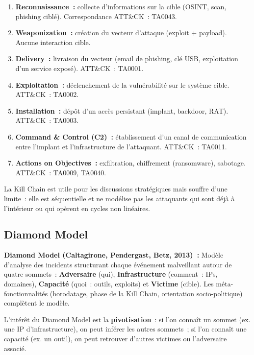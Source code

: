 \begin{enumerate}
  \item \textbf{Reconnaissance~:} collecte d'informations sur la cible (OSINT,
        scan, phishing ciblé). Correspondance ATT\&CK~: TA0043.
  \item \textbf{Weaponization~:} création du vecteur d'attaque (exploit +
        payload). Aucune interaction cible.
  \item \textbf{Delivery~:} livraison du vecteur (email de phishing, clé USB,
        exploitation d'un service exposé). ATT\&CK~: TA0001.
  \item \textbf{Exploitation~:} déclenchement de la vulnérabilité sur le
        système cible. ATT\&CK~: TA0002.
  \item \textbf{Installation~:} dépôt d'un accès persistant (implant,
        backdoor, RAT). ATT\&CK~: TA0003.
  \item \textbf{Command \& Control (C2)~:} établissement d'un canal de
        communication entre l'implant et l'infrastructure de l'attaquant.
        ATT\&CK~: TA0011.
  \item \textbf{Actions on Objectives~:} exfiltration, chiffrement
        (ransomware), sabotage. ATT\&CK~: TA0009, TA0040.
\end{enumerate}

La Kill Chain est utile pour les discussions stratégiques mais souffre
d'une limite~: elle est séquentielle et ne modélise pas les attaquants
qui sont déjà à l'intérieur ou qui opèrent en cycles non linéaires.

\subsection{Diamond Model}

\begin{boxdef}
\textbf{Diamond Model (Caltagirone, Pendergast, Betz, 2013)~:}
Modèle d'analyse des incidents structurant chaque événement malveillant
autour de quatre sommets~: \textbf{Adversaire} (qui), \textbf{Infrastructure}
(comment~: IPs, domaines), \textbf{Capacité} (quoi~: outils, exploits)
et \textbf{Victime} (cible). Les méta-fonctionnalités (horodatage,
phase de la Kill Chain, orientation socio-politique) complètent le modèle.
\end{boxdef}

L'intérêt du Diamond Model est la \textbf{pivotisation}~: si l'on
connaît un sommet (ex. une IP d'infrastructure), on peut inférer les
autres sommets~; si l'on connaît une capacité (ex. un outil), on peut
retrouver d'autres victimes ou l'adversaire associé.

